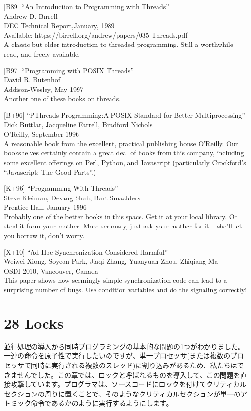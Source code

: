 {[}B89{]} ``An Introduction to Programming with Threads''\\
Andrew D. Birrell\\
DEC Technical Report,January, 1989\\
Available: https://birrell.org/andrew/papers/035-Threads.pdf\\
A classic but older introduction to threaded programming. Still a
worthwhile read, and freely available.

{[}B97{]} ``Programming with POSIX Threads''\\
David R. Butenhof\\
Addison-Wesley, May 1997\\
Another one of these books on threads.

{[}B+96{]} ``PThreads Programming:A POSIX Standard for Better
Multiprocessing''\\
Dick Buttlar, Jacqueline Farrell, Bradford Nichols\\
O'Reilly, September 1996\\
A reasonable book from the excellent, practical publishing house
O'Reilly. Our bookshelves certainly contain a great deal of books from
this company, including some excellent offerings on Perl, Python, and
Javascript (particularly Crockford's ``Javascript: The Good Parts''.)

{[}K+96{]} ``Programming With Threads''\\
Steve Kleiman, Devang Shah, Bart Smaalders\\
Prentice Hall, January 1996\\
Probably one of the better books in this space. Get it at your local
library. Or steal it from your mother. More seriously, just ask your
mother for it -- she'll let you borrow it, don't worry.

{[}X+10{]} ``Ad Hoc Synchronization Considered Harmful''\\
Weiwei Xiong, Soyeon Park, Jiaqi Zhang, Yuanyuan Zhou, Zhiqiang Ma\\
OSDI 2010, Vancouver, Canada\\
This paper shows how seemingly simple synchronization code can lead to a
surprising number of bugs. Use condition variables and do the signaling
correctly!

\hypertarget{locks-1}{%
\section*{28 Locks}\label{locks-1}}

並行処理の導入から同時プログラミングの基本的な問題の1つがわかりました。一連の命令を原子性で実行したいのですが、単一プロセッサ(または複数のプロセッサで同時に実行される複数のスレッド)に割り込みがあるため、私たちはできませんでした。この章では、ロックと呼ばれるものを導入して、この問題を直接攻撃しています。プログラマは、ソースコードにロックを付けてクリティカルセクションの周りに置くことで、そのようなクリティカルセクションが単一のアトミック命令であるかのように実行するようにします。

